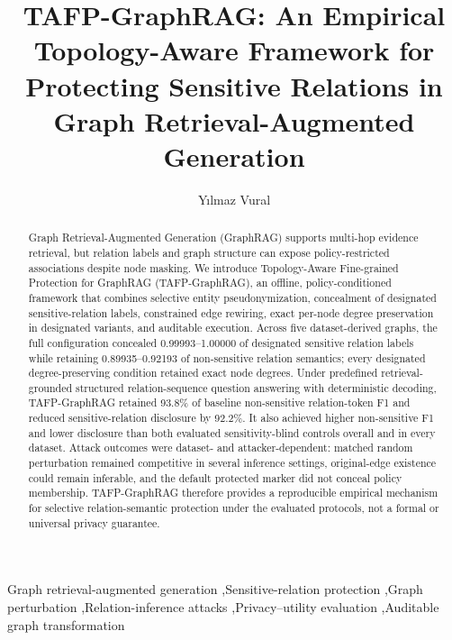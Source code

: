\documentclass[preprint,12pt]{elsarticle}
\begin{document}
\begin{frontmatter}
\title{TAFP-GraphRAG: An Empirical Topology-Aware Framework for Protecting Sensitive Relations in Graph Retrieval-Augmented Generation}
\author[aff1]{Y{\i}lmaz Vural}
\begin{abstract}
Graph Retrieval-Augmented Generation (GraphRAG) supports multi-hop evidence retrieval, but relation labels and graph structure can expose policy-restricted associations despite node masking. We introduce Topology-Aware Fine-grained Protection for GraphRAG (TAFP-GraphRAG), an offline, policy-conditioned framework that combines selective entity pseudonymization, concealment of designated sensitive-relation labels, constrained edge rewiring, exact per-node degree preservation in designated variants, and auditable execution. Across five dataset-derived graphs, the full configuration concealed 0.99993--1.00000 of designated sensitive relation labels while retaining 0.89935--0.92193 of non-sensitive relation semantics; every designated degree-preserving condition retained exact node degrees. Under predefined retrieval-grounded structured relation-sequence question answering with deterministic decoding, TAFP-GraphRAG retained 93.8\% of baseline non-sensitive relation-token F1 and reduced sensitive-relation disclosure by 92.2\%. It also achieved higher non-sensitive F1 and lower disclosure than both evaluated sensitivity-blind controls overall and in every dataset. Attack outcomes were dataset- and attacker-dependent: matched random perturbation remained competitive in several inference settings, original-edge existence could remain inferable, and the default protected marker did not conceal policy membership. TAFP-GraphRAG therefore provides a reproducible empirical mechanism for selective relation-semantic protection under the evaluated protocols, not a formal or universal privacy guarantee.
\end{abstract}
\begin{keyword}
Graph retrieval-augmented generation \sep Sensitive-relation protection \sep Graph perturbation \sep Relation-inference attacks \sep Privacy--utility evaluation \sep Auditable graph transformation
\end{keyword}
\end{frontmatter}
\end{document}
